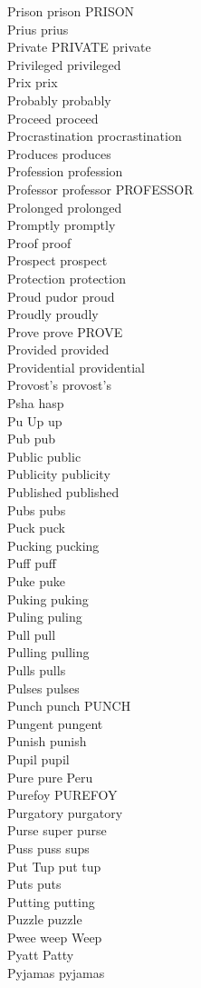 Prison prison PRISON\\
Prius prius\\
Private PRIVATE private\\
Privileged privileged\\
Prix prix\\
Probably probably\\
Proceed proceed\\
Procrastination procrastination\\
Produces produces\\
Profession profession\\
Professor professor PROFESSOR\\
Prolonged prolonged\\
Promptly promptly\\
Proof proof\\
Prospect prospect\\
Protection protection\\
Proud pudor proud\\
Proudly proudly\\
Prove prove PROVE\\
Provided provided\\
Providential providential\\
Provost's provost's\\
Psha hasp\\
Pu Up up\\
Pub pub\\
Public public\\
Publicity publicity\\
Published published\\
Pubs pubs\\
Puck puck\\
Pucking pucking\\
Puff puff\\
Puke puke\\
Puking puking\\
Puling puling\\
Pull pull\\
Pulling pulling\\
Pulls pulls\\
Pulses pulses\\
Punch punch PUNCH\\
Pungent pungent\\
Punish punish\\
Pupil pupil\\
Pure pure Peru\\
Purefoy PUREFOY\\
Purgatory purgatory\\
Purse super purse\\
Puss puss sups\\
Put Tup put tup\\
Puts puts\\
Putting putting\\
Puzzle puzzle\\
Pwee weep Weep\\
Pyatt Patty\\
Pyjamas pyjamas\\

